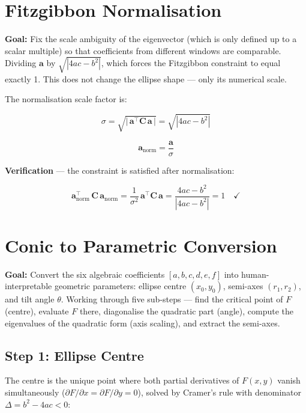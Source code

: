 \documentclass{article}
\begin{document}
	\section{Fitzgibbon Normalisation}

	
	\textbf{Goal:} Fix the scale ambiguity of the eigenvector
	(which is only defined up to a scalar multiple) so that
	coefficients from different windows are comparable.
	Dividing $\mathbf{a}$ by $\sqrt{|4ac - b^2|}$,
	which forces the Fitzgibbon constraint to equal exactly 1.
	This does not change the ellipse shape --- only its
	numerical scale.
	
	The normalisation scale factor is:
	
	\begin{equation}
		\sigma = \sqrt{\bigl|\,\mathbf{a}^\top\mathbf{C}\,\mathbf{a}\,\bigr|}
		= \sqrt{|4ac - b^2|}
	\end{equation}
	
	\begin{equation}
		\mathbf{a}_{\text{norm}} = \frac{\mathbf{a}}{\sigma}
	\end{equation}
	
	\textbf{Verification} --- the constraint is satisfied after normalisation:
	
	\begin{equation}
		\mathbf{a}_{\text{norm}}^\top\,\mathbf{C}\,\mathbf{a}_{\text{norm}}
		= \frac{1}{\sigma^2}\,\mathbf{a}^\top\mathbf{C}\,\mathbf{a}
		= \frac{4ac - b^2}{|4ac - b^2|}
		= 1 \quad \checkmark
	\end{equation}
	
	
	\section{Conic to Parametric Conversion}

	
	\textbf{Goal:} Convert the six algebraic coefficients
	$[a,b,c,d,e,f]$ into human-interpretable geometric parameters:
	ellipse centre $(x_0, y_0)$, semi-axes $(r_1, r_2)$,
	and tilt angle $\theta$.
	Working through five sub-steps --- find the
	critical point of $F$ (centre), evaluate $F$ there,
	diagonalise the quadratic part (angle), compute the
	eigenvalues of the quadratic form (axis scaling),
	and extract the semi-axes.
	
	\subsection{Step 1: Ellipse Centre}
	
	The centre is the unique point where both partial derivatives
	of $F(x,y)$ vanish simultaneously
	($\partial F/\partial x = \partial F/\partial y = 0$),
	solved by Cramer's rule with denominator $\Delta = b^2 - 4ac < 0$:
	
\end{document}

